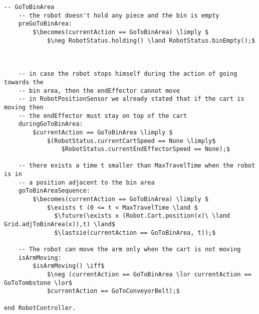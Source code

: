 \begin{lstlisting}[fontadjust, mathescape, frame=single]
  -- GoToBinArea
    -- the robot doesn't hold any piece and the bin is empty
    preGoToBinArea:
        $\becomes(currentAction == GoToBinArea) \limply $
            $\neg RobotStatus.holding() \land RobotStatus.binEmpty();$
    


    -- in case the robot stops himself during the action of going towards the 
    -- bin area, then the endEffector cannot move
    -- in RobotPositionSensor we already stated that if the cart is moving then 
    -- the endEffector must stay on top of the cart
    duringGoToBinArea:
        $currentAction == GoToBinArea \limply $
            $(RobotStatus.currentCartSpeed == None \limply$
                $RobotStatus.currentEndEffectorSpeed == None);$

    -- there exists a time t smaller than MaxTravelTime when the robot is in 
    -- a position adjacent to the bin area
    goToBinAreaSequence:
        $\becomes(currentAction == GoToBinArea) \limply $
            $\exists t (0 <= t < MaxTravelTime \land $
              $\future(\exists x (Robot.Cart.position(x)\ \land Grid.adjToBinArea(x)),t) \land$
              $\lastsie(currentAction == GoToBinArea, t));$
                      
    -- The robot can move the arm only when the cart is not moving
    isArmMoving: 
        $isArmMoving() \iff$
            $\neg (currentAction == GoToBinArea \lor currentAction == GoToTombstone \lor$
            $currentAction == GoToConveyorBelt);$
         
end RobotController.
\end{lstlisting}